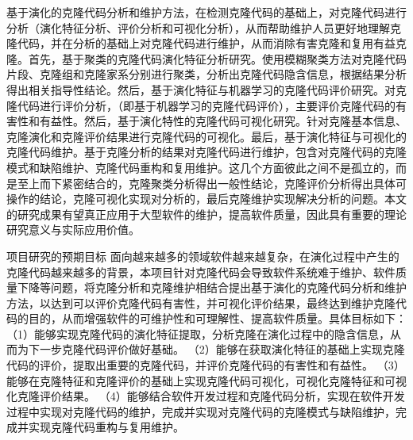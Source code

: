 基于演化的克隆代码分析和维护方法，在检测克隆代码的基础上，对克隆代码进行分析（演化特征分析、评价分析和可视化分析），从而帮助维护人员更好地理解克隆代码，并在分析的基础上对克隆代码进行维护，从而消除有害克隆和复用有益克隆。首先，基于聚类的克隆代码演化特征分析研究。使用模糊聚类方法对克隆代码片段、克隆组和克隆家系分别进行聚类，分析出克隆代码隐含信息，根据结果分析得出相关指导性结论。然后，基于演化特征与机器学习的克隆代码评价研究。对克隆代码进行评价分析，（即基于机器学习的克隆代码评价），主要评价克隆代码的有害性和有益性。然后，基于演化特性的克隆代码可视化研究。针对克隆基本信息、克隆演化和克隆评价结果进行克隆代码的可视化。最后，基于演化特征与可视化的克隆代码维护。基于克隆分析的结果对克隆代码进行维护，包含对克隆代码的克隆模式和缺陷维护、克隆代码重构和复用维护。这几个方面彼此之间不是孤立的，而是至上而下紧密结合的，克隆聚类分析得出一般性结论，克隆评价分析得出具体可操作的结论，克隆可视化实现对分析的，最后克隆维护实现解决分析的问题。本文的研究成果有望真正应用于大型软件的维护，提高软件质量，因此具有重要的理论研究意义与实际应用价值。

项目研究的预期目标
面向越来越多的领域软件越来越复杂，在演化过程中产生的克隆代码越来越多的背景，本项目针对克隆代码会导致软件系统难于维护、软件质量下降等问题，将克隆分析和克隆维护相结合提出基于演化的克隆代码分析和维护方法，以达到可以评价克隆代码有害性，并可视化评价结果，最终达到维护克隆代码的目的，从而增强软件的可维护性和可理解性、提高软件质量。具体目标如下：
（1）能够实现克隆代码的演化特征提取，分析克隆在演化过程中的隐含信息，从而为下一步克隆代码评价做好基础。
（2）能够在获取演化特征的基础上实现克隆代码的评价，提取出重要的克隆代码，并评价克隆代码的有害性和有益性。
（3）能够在克隆特征和克隆评价的基础上实现克隆代码可视化，可视化克隆特征和可视化克隆评价结果。
（4）能够结合软件开发过程和克隆代码分析，实现在软件开发过程中实现对克隆代码的维护，完成并实现对克隆代码的克隆模式与缺陷维护，完成并实现克隆代码重构与复用维护。


